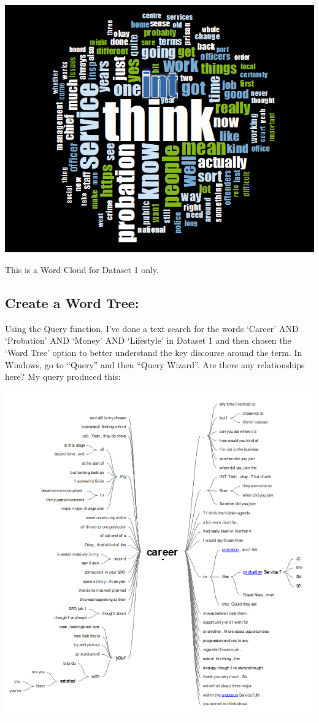 \documentclass[
]{book}
\begin{document}
\includegraphics{imgs/cloud_w9.png}

This is a Word Cloud for Dataset 1 only.

\hypertarget{create-a-word-tree}{%
\subsection{Create a Word Tree:}\label{create-a-word-tree}}

Using the Query function, I've done a text search for the words `Career' AND `Probation' AND `Money' AND `Lifestyle' in Dataset 1 and then chosen the `Word Tree' option to better understand the key discourse around the term. In Windows, go to ``Query'' and then ``Query Wizard''. Are there any relationships here? My query produced this:

\includegraphics{imgs/wordtree.png}
\end{document}
